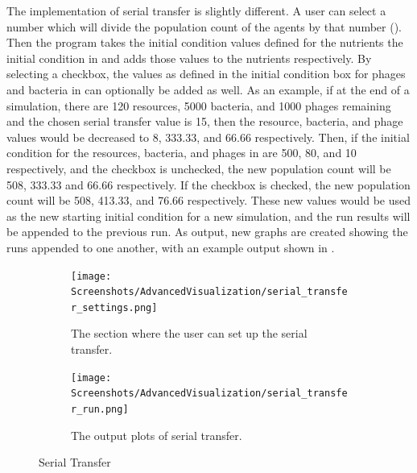 The implementation of serial transfer is slightly different.
A user can select a number which will divide the population count of the agents by that number ().
Then the program takes the initial condition values defined for the nutrients the initial condition in  and adds those values to the nutrients respectively.
By selecting a checkbox, the values as defined in the initial condition box for phages and bacteria in  can optionally be added as well.
As an example, if at the end of a simulation, there are 120 resources, 5000 bacteria, and 1000 phages remaining and the chosen serial transfer value is 15, then the resource, bacteria, and phage values would be decreased to 8, 333.33, and 66.66 respectively.
Then, if the initial condition for the resources, bacteria, and phages in  are 500, 80, and 10 respectively, and the checkbox is unchecked, the new population count will be 508, 333.33 and 66.66 respectively.
If the checkbox is checked, the new population count will be 508, 413.33, and 76.66 respectively.
These new values would be used as the new starting initial condition for a new simulation, and the run results will be appended to the previous run.
As output, new graphs are created showing the runs appended to one another, with an example output shown in .

\begin{figure}[h!]
    \centering
    \begin{subfigure}{0.49\linewidth}
        \centering
        \vspace*{\fill}
        \texttt{[image: Screenshots/AdvancedVisualization/serial\_transfer\_settings.png]}
        \caption{
            The section where the user can set up the serial transfer.
        }
        \label{fig:ss:av:serial_transfer_settings}
        \vspace*{\fill}
    \end{subfigure}
    \hfill
    \begin{subfigure}{0.49\linewidth}
        \centering
        \vspace*{\fill}
        \texttt{[image: Screenshots/AdvancedVisualization/serial\_transfer\_run.png]}
        \caption{
            The output plots of serial transfer. 
        }
        \label{fig:ss:av:serial_transfer_run}
        \vspace*{\fill}
    \end{subfigure}
    \caption{Serial Transfer}
 \end{figure}

